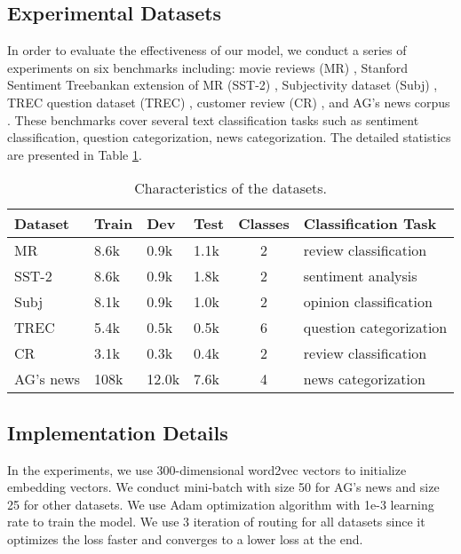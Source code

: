 \documentclass[11pt]{article}
\begin{document}
\subsection{Experimental Datasets}


In order to evaluate the effectiveness of our model, 
we conduct a series of experiments on six benchmarks including: movie reviews (MR) \cite{pang2005seeing}, Stanford Sentiment Treebankan extension of MR (SST-2) \cite{socher2013recursive}, Subjectivity dataset (Subj) \cite{pang2004sentimental},  TREC question dataset (TREC) \cite{li2002learning}, customer review (CR) \cite{hu2004mining}, and AG's news corpus \cite{conneau2017very}. 
These benchmarks cover several text classification tasks such as sentiment classification, question categorization, news categorization. The detailed statistics are presented in Table \ref{tab:0}. 
\begin{table}[h]
\centering
	\resizebox{1\columnwidth}{!}
	{\footnotesize
	\begin{tabular}{|l|lllc|l|}
		\toprule
		Dataset & Train & Dev &Test & Classes & Classification Task \\
		\midrule
		MR &  8.6k & 0.9k & 1.1k & 2 & review classification\\
		SST-2 & 8.6k  & 0.9k & 1.8k & 2 & sentiment analysis\\
		Subj & 8.1k  & 0.9k & 1.0k & 2 & opinion classification\\
		TREC & 5.4k & 0.5k & 0.5k & 6 & question categorization\\
		CR & 3.1k & 0.3k & 0.4k & 2 & review classification\\
		AG's news & 108k & 12.0k & 7.6k & 4 & news categorization\\
		\bottomrule
	\end{tabular}
	}
\caption{Characteristics of the datasets.}
\label{tab:0}
\vspace{-0.3cm}
\end{table}













\subsection{Implementation Details}
In the experiments, we use 300-dimensional word2vec \cite{mikolov2013distributed} vectors to initialize embedding vectors.
We conduct mini-batch with size 50 for AG's news and size 25 for other datasets. We use Adam optimization algorithm with 1e-3 learning rate to train the model. We use 3 iteration of routing for all datasets since it optimizes the loss faster and converges to a lower loss at the end.
\end{document}

